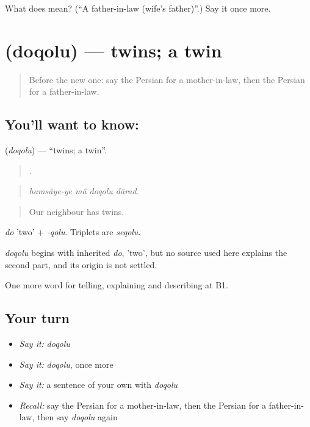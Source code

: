 \begin{tcolorbox}[breakable,colback=teal!4,colframe=teal!35!black,title={Before you move on}]
What does  mean? (\textquotedblleft{}A father-in-law (wife's father)\textquotedblright{}.) Say it once more.
\end{tcolorbox}
\section[\texorpdfstring{\fa{دوقلو} (doqolu)}{دوقلو (doqolu)}]{ (doqolu) — twins; a twin}

\label{lesson:FA-C501-doqolu}



\begin{quote}
Before the new one: say the Persian for a mother-in-law, then the Persian for a father-in-law.
\end{quote}

\subsection*{You'll want to know: }
\textbf{} (\emph{doqolu}) — \textquotedblleft{}twins; a twin\textquotedblright{}.

\begin{quote}
   .
\end{quote}

\begin{quote}
\emph{hamsâye-ye mâ doqolu dârad.}
\end{quote}

\begin{quote}
Our neighbour has twins.
\end{quote}

\emph{do} 'two' + \emph{-qolu}. Triplets are \emph{seqolu}.

\begin{cousinweb}
\emph{doqolu} begins with inherited \emph{do}, 'two', but no source used here explains the second part, and its origin is not settled.
\end{cousinweb}

\begin{grammarlens}[title={What you've built}]
One more word for telling, explaining and describing at B1.
\end{grammarlens}

\subsection*{Your turn}
\begin{itemize}
\raggedright
  \item \emph{Say it:} \emph{doqolu}
  \item \emph{Say it:} \emph{doqolu}, once more
  \item \emph{Say it:} a sentence of your own with \emph{doqolu}
  \item \emph{Recall:} say the Persian for a mother-in-law, then the Persian for a father-in-law, then say \emph{doqolu} again
\end{itemize}

